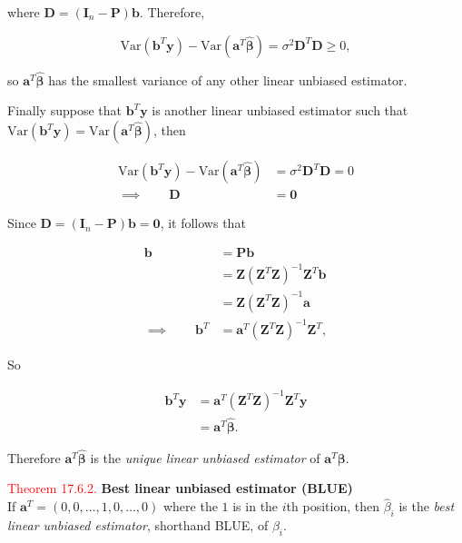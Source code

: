 \documentclass[
]{book}
\begin{document}
where \(\mathbf{D} = (\mathbf{I}_n-\mathbf{P})\mathbf{b}\). Therefore,

\[\text{Var}(\mathbf{b}^T\mathbf{y})-\text{Var}(\mathbf{a}^T\mathbf{\hat{\beta}}) = \sigma^2 \mathbf{D}^T\mathbf{D} \geq 0, \]

so \(\mathbf{a}^T\mathbf{\hat{\beta}}\) has the smallest variance of any other linear unbiased estimator.

Finally suppose that \(\mathbf{b}^T\mathbf{y}\) is another linear unbiased estimator such that \(\text{Var}(\mathbf{b}^T\mathbf{y}) = \text{Var}(\mathbf{a}^T\mathbf{\hat{\beta}})\), then

\begin{align*}
\text{Var}(\mathbf{b}^T\mathbf{y}) - \text{Var}(\mathbf{a}^T\mathbf{\hat{\beta}}) &= \sigma^2 \mathbf{D}^T\mathbf{D}=0 \\
\implies \qquad \mathbf{D}&=\mathbf{0}
\end{align*}

Since \(\mathbf{D}=(\mathbf{I}_n-\mathbf{P})\mathbf{b}=\mathbf{0}\), it follows that

\begin{align*}
\mathbf{b} &= \mathbf{P}\mathbf{b} \\ 
&= \mathbf{Z}(\mathbf{Z}^T\mathbf{Z})^{-1}\mathbf{Z}^T\mathbf{b} \\
&= \mathbf{Z}(\mathbf{Z}^T\mathbf{Z})^{-1}\mathbf{a} \\
\implies \qquad \mathbf{b}^T &= \mathbf{a}^T(\mathbf{Z}^T\mathbf{Z})^{-1}\mathbf{Z}^T,
\end{align*}

So

\begin{align*}
\mathbf{b}^T\mathbf{y} &= \mathbf{a}^T(\mathbf{Z}^T\mathbf{Z})^{-1}\mathbf{Z}^T\mathbf{y} \\
&=\mathbf{a}^T\mathbf{\hat{\beta}}.
\end{align*}

Therefore \(\mathbf{a}^T\mathbf{\hat{\beta}}\) is the \emph{unique linear unbiased estimator} of \(\mathbf{a}^T\mathbf{\beta}\).

\hfill\break

\leavevmode{}%
\textcolor{red}{Theorem 17.6.2.}
{\textbf{Best linear unbiased estimator (BLUE)}}\\
If \(\mathbf{a}^T=(0,0,\dots,1,0,\dots,0)\) where the \(1\) is in the \(i\)th position, then \(\hat{\beta}_i\) is the
\emph{best linear unbiased estimator}, shorthand BLUE, of \(\beta_i\).
\end{document}
